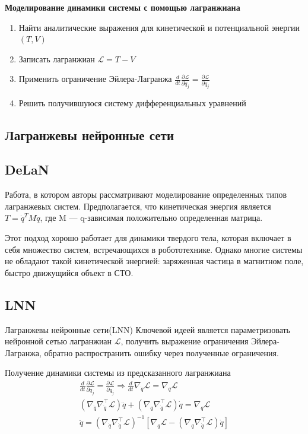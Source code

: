 \documentclass[12pt]{article}
\begin{document}
	\textbf{Моделирование динамики системы с помощью лагранжиана}
		\begin{enumerate}
			\item Найти аналитические выражения для кинетической и потенциальной энергии $(T, V )$
			\item Записать лагранжиан $\mathcal{L} = T - V $
			\item Применить ограничение Эйлера-Лагранжа $\frac{d}{d t} \frac{\partial \mathcal{L}}{\partial \dot{q}_{j}} =\frac{\partial \mathcal{L}}{\partial q_{j}} $
			\item Решить получившуюся систему дифференциальных уравнений
		\end{enumerate}

	
	\subsection{Лагранжевы нейронные сети}
	

	
	\subsection{DeLaN}
	Работа, в котором авторы рассматривают моделирование определенных типов лагранжевых систем. Предполагается, что кинетическая энергия является $T = \dot{q}^TM\dot{q}$, где M — q-зависимая положительно определенная матрица. 
	
	Этот подход хорошо работает для динамики твердого тела, которая включает в себя множество систем, встречающихся в робототехнике. Однако многие системы не обладают такой кинетической энергией: заряженная частица в магнитном поле, быстро движущийся объект в СТО.
	
	\subsection{LNN}
	Лагранжевы нейронные сети(LNN)
	Ключевой идеей является параметризовать нейронной сетью лагранжиан $\mathcal{L}$, получить выражение ограничения Эйлера-Лагранжа, обратно распространить ошибку через полученные ограничения.
	
	Получение динамики системы из предсказанного лагранжиана	
	$$
		\begin{aligned}
		\frac{d}{d t} \frac{\partial \mathcal{L}}{\partial \dot{q}_{j}} =\frac{\partial \mathcal{L}}{\partial q_{j}}  \Rightarrow \frac{d}{d t} \nabla_{\dot{q}} \mathcal{L} =\nabla_{q} \mathcal{L} \\
		\left(\nabla_{\dot{q}} \nabla_{\dot{q}}^{\top} \mathcal{L}\right) \ddot{q}+\left(\nabla_{q} \nabla_{\dot{q}}^{\top} \mathcal{L}\right) \dot{q} =\nabla_{q} \mathcal{L} \\
		\ddot{q} =\left(\nabla_{\dot{q}} \nabla_{\dot{q}}^{\top} \mathcal{L}\right)^{-1}\left[\nabla_{q} \mathcal{L}-\left(\nabla_{q} \nabla_{\dot{q}}^{\top} \mathcal{L}\right) \dot{q}\right]
		\end{aligned}
		$$
	
\end{document}
